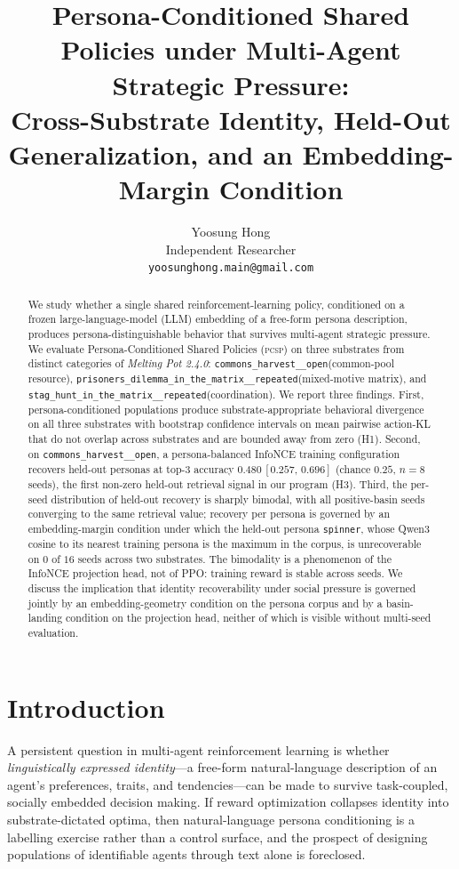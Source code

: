 \documentclass[11pt]{article}
\title{Persona-Conditioned Shared Policies under Multi-Agent Strategic
Pressure:\\Cross-Substrate Identity, Held-Out Generalization, and an
Embedding-Margin Condition}
\author{%
  Yoosung Hong\\
  Independent Researcher\\
  \texttt{yoosunghong.main@gmail.com}
}
\date{}
\newcommand{\PCSP}{\textsc{pcsp}\xspace}
\newcommand{\InfoNCE}{InfoNCE\xspace}
\newcommand{\cH}{\texttt{commons\_harvest\_\_open}\xspace}
\newcommand{\PD}{\texttt{prisoners\_dilemma\_in\_the\_matrix\_\_repeated}\xspace}
\newcommand{\stag}{\texttt{stag\_hunt\_in\_the\_matrix\_\_repeated}\xspace}
\begin{document}
\maketitle

\begin{abstract}
We study whether a single shared reinforcement-learning policy, conditioned on
a frozen large-language-model (LLM) embedding of a free-form persona description,
produces persona-distinguishable behavior that survives multi-agent strategic
pressure. We evaluate Persona-Conditioned Shared Policies (\PCSP) on three
substrates from distinct categories of \textit{Melting Pot 2.4.0}:
\cH (common-pool resource), \PD (mixed-motive matrix), and \stag (coordination).
We report three findings. First, persona-conditioned populations produce
substrate-appropriate behavioral divergence on all three substrates with bootstrap
confidence intervals on mean pairwise action-KL that do not overlap across
substrates and are bounded away from zero (H1). Second, on \cH, a
persona-balanced \InfoNCE training configuration recovers held-out personas at
top-3 accuracy $0.480\,[0.257,\,0.696]$ (chance $0.25$, $n=8$ seeds), the first
non-zero held-out retrieval signal in our program (H3). Third, the per-seed
distribution of held-out recovery is sharply bimodal, with all positive-basin
seeds converging to the same retrieval value; recovery per persona is governed
by an embedding-margin condition under which the held-out persona
\texttt{spinner}, whose Qwen3 cosine to its nearest training persona is the
maximum in the corpus, is unrecoverable on $0$ of $16$ seeds across two
substrates. The bimodality is a phenomenon of the \InfoNCE projection head, not
of PPO: training reward is stable across seeds. We discuss the implication that
identity recoverability under social pressure is governed jointly by an
embedding-geometry condition on the persona corpus and by a basin-landing
condition on the projection head, neither of which is visible without
multi-seed evaluation.
\end{abstract}

\section{Introduction}
\label{sec:intro}

A persistent question in multi-agent reinforcement learning is whether
\textit{linguistically expressed identity}---a free-form natural-language
description of an agent's preferences, traits, and tendencies---can be made to
survive task-coupled, socially embedded decision making. If reward optimization
collapses identity into substrate-dictated optima, then natural-language
persona conditioning is a labelling exercise rather than a control surface, and
the prospect of designing populations of identifiable agents through text alone
is foreclosed.
\end{document}
